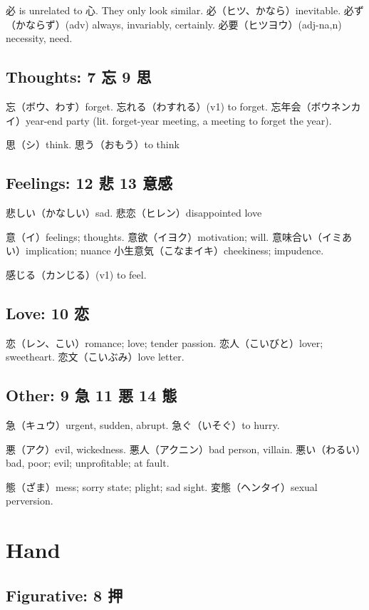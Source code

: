 必 is unrelated to 心. They only look similar.
必（ヒツ、かなら）inevitable.
必ず（かならず）(adv) always, invariably, certainly.
必要（ヒツヨウ）(adj-na,n) necessity, need.

\subsection{Thoughts: 7 忘 9 思}

忘（ボウ、わす）forget.
忘れる（わすれる）(v1) to forget.
忘年会（ボウネンカイ）year-end party
(lit. forget-year meeting, a meeting to forget the year).

思（シ）think.
思う（おもう）to think

\subsection{Feelings: 12 悲 13 意感}

悲しい（かなしい）sad.
悲恋（ヒレン）disappointed love

意（イ）feelings; thoughts.
意欲（イヨク）motivation; will.
意味合い（イミあい）implication; nuance
小生意気（こなまイキ）cheekiness; impudence.

感じる（カンじる）(v1) to feel.

\subsection{Love: 10 恋}

恋（レン、こい）romance; love; tender passion.
恋人（こいびと）lover; sweetheart.
恋文（こいぶみ）love letter.

\subsection{Other: 9 急 11 悪 14 態}

急（キュウ）urgent, sudden, abrupt.
急ぐ（いそぐ）to hurry.

悪（アク）evil, wickedness.
悪人（アクニン）bad person, villain.
悪い（わるい）bad, poor; evil; unprofitable; at fault.

態（ざま）mess; sorry state; plight; sad sight.
変態（ヘンタイ）sexual perversion.

\section{Hand}

\subsection{Figurative: 8 押}

